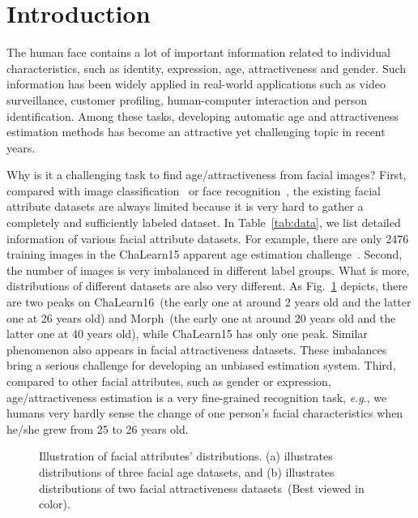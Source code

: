 \documentclass[5p,times,twocolumn]{elsarticle}
\makeatletter
\DeclareRobustCommand\onedot{\@onedot}
\def\@onedot{.}
\def\eg{\emph{e.g}\onedot}
\makeatother
\begin{document}
\section{Introduction}
The human face contains a lot of important information related to individual characteristics, such as identity, expression, age, attractiveness and gender. Such information has been widely applied in real-world applications such as video surveillance, customer profiling, human-computer interaction and person identification. Among these tasks, developing automatic age and attractiveness estimation methods has become an attractive yet challenging topic in recent years. 

Why is it a challenging task to find age/attractiveness from facial images? First, compared with image classification~\cite{deng2009imagenet} or face recognition~\cite{parkhi2015deep,guo2016ms,shakeel2019deep}, the existing facial attribute datasets are always limited because it is very hard to gather a completely and sufficiently labeled dataset. In Table~\ref{tab:data}, we list detailed information of various facial attribute datasets. For example, there are only 2476 training images in the ChaLearn15 apparent age estimation challenge~\cite{escalera2015chalearn}. Second, the number of images is very imbalanced in different label groups. What is more, distributions of different datasets are also very different. As Fig.~\ref{fig:datadis} depicts, there are two peaks on ChaLearn16~(the early one at around 2 years old and the latter one at 26 years old) and Morph~(the early one at around 20 years old and the latter one at 40 years old), while ChaLearn15  has only one peak. Similar phenomenon also appears in facial attractiveness datasets. These imbalances bring a serious challenge for developing an unbiased estimation system. Third, compared to other facial attributes, such as gender or expression, age/attractiveness estimation is a very fine-grained recognition task, \eg, we {humans} very hardly sense the change of one person's facial characteristics when he/she grew from 25 to 26 years old.

\begin{figure}
 \centering
\caption{Illustration of facial attributes' distributions. (a) illustrates distributions of three facial age datasets, and (b) illustrates distributions of two facial attractiveness datasets~(Best viewed in color).} \label{fig:datadis}
\vspace{-10pt}
\end{figure}
\end{document}

